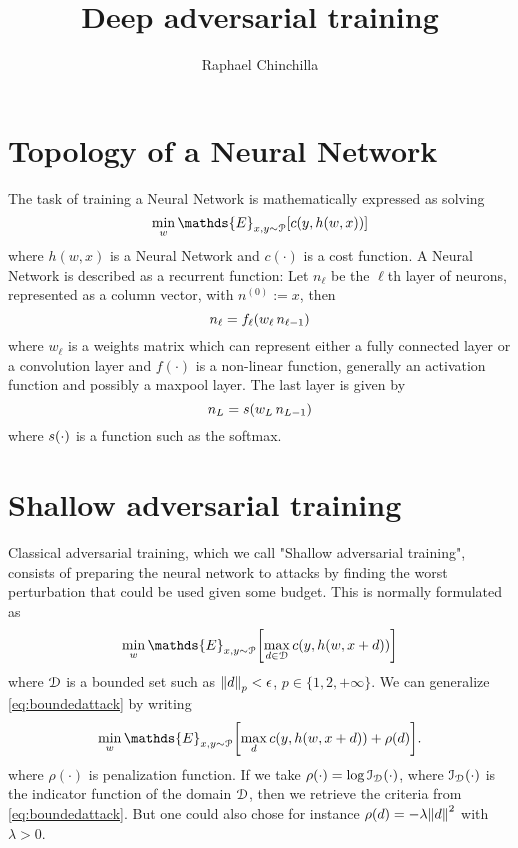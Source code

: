 \documentclass[11pt,letterpaper,DIV=17]{scrartcl}
\title{Deep adversarial training}
\author{Raphael Chinchilla}
\date{\vspace{-4ex}}
\renewcommand{\eE}{\mathds{E}}
\renewcommand{\eE}{\mathds{E}}
\renewcommand{\l}[1][]{_{\ell#1}}
\renewcommand{\L}[1][]{_{L#1}}
\newcommand{\s}{s\qty}
\renewcommand{\c}{c\qty}
\newcommand{\f}{f\l\qty}
\begin{document}
\maketitle

\section{Topology of a Neural Network}

The task of training a Neural Network is mathematically expressed as solving 
\begin{equation} \label{eq:learning}
\min_{w} \eE_{x,y\sim\Pcal}[\c(y,h(w,x))]
\end{equation}
where $h(w,x)$ is a Neural Network and $c(\cdot)$ is a cost function. A Neural Network is described as a recurrent function: Let $n\l$ be the $\ell$th layer of neurons, represented as a column vector, with $n^{(0)}:=x$, then 
\begin{equation} \label{eq:neuron}
n\l=\f(w\l\,n\l[-1])
\end{equation}
where $w\l$ is a weights matrix which can represent either a fully connected layer or a convolution layer and $f(\cdot)$ is a non-linear function, generally an activation function and possibly a maxpool layer. The last layer is given by
\begin{equation} \label{eq:lastlayer}
n\L=\s(w\L\,n\L[-1])
\end{equation}
where $\s(\cdot)$ is a function such as the softmax.

\section{Shallow adversarial training}

Classical adversarial training, which we call "Shallow adversarial training", consists of preparing the neural network to attacks by finding the worst perturbation that could be used given some budget. This is normally formulated as
\begin{equation} \label{eq:boundedattack}
\min_{w} \eE_{x,y\sim\Pcal}\qty[\max_{d\in\Dcal}\c(y,h(w,x+d))]
\end{equation}
where ${\mathcal{D}}$ is a bounded set such as $\norm{d}_p<\epsilon$, $p\in\{1,2,+\infty\}$. We can generalize \eqref{eq:boundedattack} by writing
\begin{equation} \label{eq:shallow}
\min_{w} \eE_{x,y\sim\Pcal}\qty[\max_{d}\c(y,h(w,x+d))+\rho(d)].
\end{equation}
where $\rho(\cdot)$ is penalization function. If we take $\rho(\cdot)=\log{\mathcal{I}}_{{\mathcal{D}}}(\cdot)$, where ${\mathcal{I}}_{{\mathcal{D}}}(\cdot)$ is the indicator function of the domain ${\mathcal{D}}$, then we retrieve the criteria from \eqref{eq:boundedattack}. But one could also chose for instance $\rho(d)=-\lambda\norm{d}^2$ with $\lambda>0$.
\end{document}

